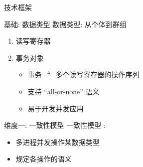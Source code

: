 \begin{frame}{技术框架}
\end{frame}
\begin{frame}{基础: 数据类型}
	数据类型: 从个体到群组
	\pause
	\vspace{0.20cm}
	\begin{enumerate}
	  \setlength{\itemsep}{8pt}
	  \item<2-> 读写寄存器
	  \item<3-> 事务对象
		\begin{itemize}
		  \setlength{\itemsep}{4pt}
		  \item 事务 $\triangleq$ 多个读写寄存器的操作序列
		  \item 支持 ``all-or-none'' 语义
		  \item 易于开发并发应用
		\end{itemize}
	\end{enumerate}
\end{frame}
\begin{frame}{维度一: 一致性模型}
  一致性模型  :
  \vspace{0.20cm}
  \begin{itemize}
    \item 多进程并发操作某数据类型
	\item 规定各操作的语义
  \end{itemize}

  \vspace{0.20cm}
\end{frame}
